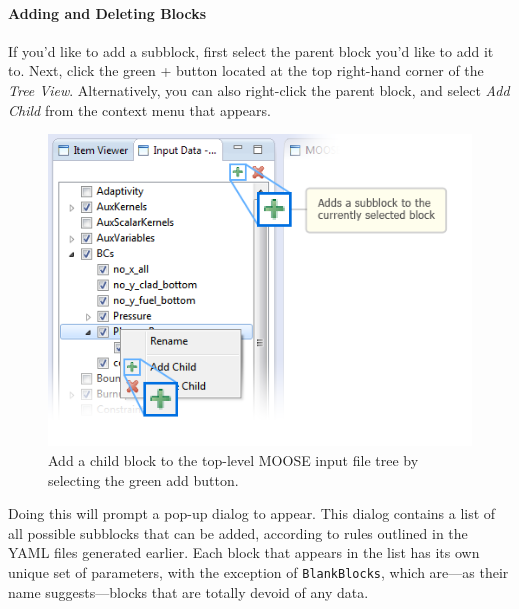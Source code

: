 \paragraph{Adding and Deleting Blocks}\label{adding-and-deleting-blocks}

If you'd like to add a subblock, first select the parent block you'd
like to add it to. Next, click the green + button located at the top
right-hand corner of the \emph{Tree View}. Alternatively, you can also
right-click the parent block, and select \emph{Add Child} from the
context menu that appears.

\begin{figure}[htbp]
\centering
\includegraphics[scale=.6]{figures/ICE_MOOSEAddBlock.png}
\caption{Add a child block to the top-level MOOSE input file tree by selecting the green add button. }
\end{figure}

Doing this will prompt a pop-up dialog to appear. This dialog contains a
list of all possible subblocks that can be added, according to rules
outlined in the YAML files generated earlier. Each block that appears in
the list has its own unique set of parameters, with the exception of
\texttt{BlankBlocks}, which are---as their name suggests---blocks that
are totally devoid of any data.

